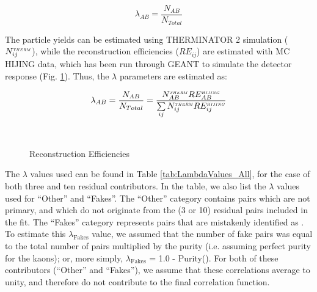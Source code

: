 \documentclass[/home/jesse/Analysis/FemtoAnalysis/AnalysisNotes/AnalysisNoteJBuxton.tex]{subfiles}
\begin{document}
\begin{equation}
\lambda_{AB} = \frac{N_{AB}}{N_{Total}}
\end{equation}

The particle yields can be estimated using THERMINATOR 2 simulation ($N_{ij}^{\scaleto{THERM}{3pt}}$), while the reconstruction efficiencies ($RE_{ij}$) are estimated with MC HIJING data, which has been run through GEANT to simulate the detector response (Fig. \ref{fig:RecoEffs}).  Thus, the $\lambda$ parameters are estimated as:

\begin{equation}
\lambda_{AB} = \frac{N_{AB}}{N_{Total}} = \frac{N_{AB}^{\scaleto{THERM}{3pt}}RE_{AB}^{\scaleto{HIJING}{3pt}}}{\sum\limits_{ij} N_{ij}^{\scaleto{THERM}{3pt}}RE_{ij}^{\scaleto{HIJING}{3pt}}}
\end{equation}

\begin{figure}[h!]
  \centering
   \\
  \caption[Reconstruction Efficiencies]{Reconstruction Efficiencies}
  \label{fig:RecoEffs}
\end{figure}

The $\lambda$ values used can be found in Table \ref{tab:LambdaValues_All}, for the case of both three and ten residual contributors.  In the table, we also list the $\lambda$ values used for ``Other'' and ``Fakes''.  The ``Other'' category contains pairs which are not primary, and which do not originate from the (3 or 10) residual pairs included in the fit.  The ``Fakes'' category represents pairs that are mistakenly identified as \LamK.  To estimate this $\lambda_{\mathrm{Fakes}}$ value, we assumed that the number of fake pairs was equal to the total number of pairs multiplied by the \Lam purity (i.e. assuming perfect purity for the kaons); or, more simply, $\lambda_{\mathrm{Fakes}}$ = 1.0 - Purity(\Lam).  For both of these contributors (``Other'' and ``Fakes''), we assume that these correlations average to unity, and therefore do not contribute to the final correlation function.
\end{document}
